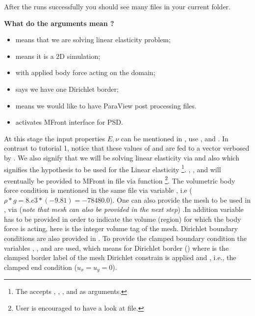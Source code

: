 After the  runs successfully you should see many
 files in your current folder.

\textbf{What do the arguments mean ?}

\begin{itemize}
\item {} means that we are solving linear elasticity problem;
\item {} means it is a 2D simulation;
\item {} with applied body force acting on the domain;
\item {} says we have one Dirichlet border;
\item {} means we would like to have ParaView post processing files.
\item {} activates MFront interface for PSD.
\end{itemize}

At this stage the input properties \(E,\nu\) can be mentioned in
, use , and .
In contrast to tutorial 1, notice that these values of  and
 are fed to a vector  verbosed by
. We also signify
that we will be solving linear elasticity via
 and also
 which signifies the
hypothesis to be used for the Linear elasticity
\footnote{The  accepts ,  , ,  and   as arguments.}.
, , and 
will eventually be provided to MFront in  file
via  function
\footnote{User is encouraged to have a look at  file.}.
The volumetric body force condition is mentioned in the same file via
variable , i.e (\(\rho*g=8.e3*(-9.81)=-78480.0\)).
One can also provide the mesh to be used in ,
via 
(\textit{note that mesh can also be provided in the next step}) .In
addition variable  has to be provided in order to indicate
the volume (region) for which the body force is acting, here  is
the integer volume tag of the mesh. Dirichlet boundary conditions are
also provided in . To provide the clamped
boundary condition the variables , , and
 are used, which means for Dirichlet border 
() where  is the clamped border label of the mesh
Dirichlet constrain is applied and ,  i.e.,
the clamped end condition (\(u_x=u_y=0\)).

